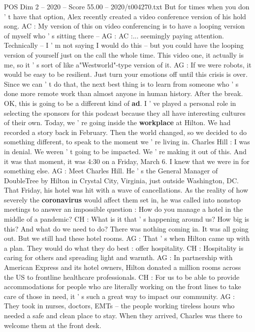 \begin{textsample}{POS Dim 2 – 2020 – Score 55.00 – 2020/t004270.txt}
But for times when you don ' t have that option, Alex recently created a video conference version of his hold song.
AC : My version of this on video conferencing is to have a looping version of myself who ' s sitting there -- AG : AC :... seemingly paying attention.
Technically -- I ' m not saying I would do this -- but you could have the looping version of yourself just on the call the whole time.
This video one, it actually is me, so it ' s sort of like a"Westworld"-type version of it.
AG : If we were robots, it would be easy to be resilient.
Just turn your emotions off until this crisis is over.
Since we can ' t do that, the next best thing is to learn from someone who ' s done more remote work than almost anyone in human history.
After the break.
OK, this is going to be a different kind of \textbf{ad}.
I ' ve played a personal role in selecting the sponsors for this podcast because they all have interesting cultures of their own.
Today, we ' re going inside the \textbf{workplace} at Hilton.
We had recorded a story back in February.
Then the world changed, so we decided to do something different, to speak to the moment we ' re living in.
Charles Hill : I was in denial.
We weren ' t going to be impacted.
We ' re making it out of this.
And it was that moment, it was 4:30 on a Friday, March 6.
I knew that we were in for something else.
AG : Meet Charles Hill.
He ' s the General Manager of DoubleTree by Hilton in Crystal City, Virginia, just outside Washington, DC.
That Friday, his hotel was hit with a wave of cancellations.
As the reality of how severely the \textbf{coronavirus} would affect them set in, he was called into nonstop meetings to answer an impossible question : How do you manage a hotel in the middle of a pandemic?
CH : What is it that ' s happening around us?
How big is this?
And what do we need to do?
There was nothing coming in.
It was all going out.
But we still had these hotel rooms.
AG : That ' s when Hilton came up with a plan.
They would do what they do best : offer hospitality.
CH : Hospitality is caring for others and spreading light and warmth.
AG : In partnership with American Express and its hotel owners, Hilton donated a million rooms across the US to frontline healthcare professionals.
CH : For us to be able to provide accommodations for people who are literally working on the front lines to take care of those in need, it ' s such a great way to impact our community.
AG : They took in nurses, doctors, EMTs -- the people working tireless hours who needed a safe and clean place to stay.
When they arrived, Charles was there to welcome them at the front desk.

\end{textsample}
